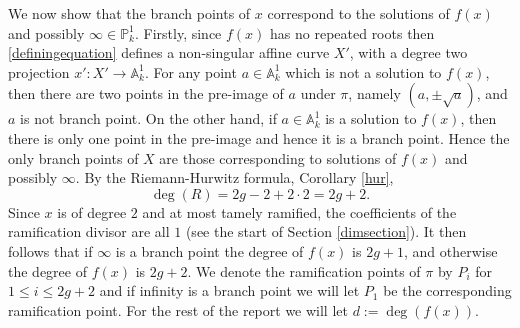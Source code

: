 \documentclass[11pt]{article} %
\theoremstyle{plain}
\theoremstyle{remark}
\begin{document}
We now show that the branch points of $x$ correspond to the solutions of $f(x)$ and possibly $\infty \in \mathbb P_k^1$.
Firstly, since $f(x)$ has no repeated roots then \eqref{definingequation} defines a non-singular affine curve $X'$, with a degree two projection $x': X'\rightarrow \mathbb A_k^1$.
For any point $a\in \mathbb A_k^1$ which is not a solution to $f(x)$, then there are two points in the pre-image of $a$ under $\pi$, namely $(a,\pm \sqrt{a})$, and $a$ is not branch point.
On the other hand, if $a\in \mathbb A_k^1$ is a solution to $f(x)$, then there is only one point in the pre-image and hence it is a branch point.
Hence the only branch points of $X$ are those corresponding to solutions of $f(x)$ and possibly $\infty$.
By the Riemann-Hurwitz formula, Corollary \ref{hur},
\[ 
\deg(R) = 2g -2 +2\cdot 2 = 2g + 2.
\]
Since $x$ is of degree $2$ and at most tamely ramified, the coefficients of the ramification divisor are all $1$ (see the start of Section \ref{dimsection}).
It then follows that if $\infty$ is a branch point the degree of $f(x)$ is $2g+1$, and otherwise the degree of $f(x)$ is $2g+2$.
We denote the ramification points of $\pi$ by $P_i$ for $1 \leq i \leq 2g+2$ and if infinity is a branch point we will let $P_1$ be the corresponding ramification point.
For the rest of the report we will let $d:=\deg(f(x))$.
\end{document}
